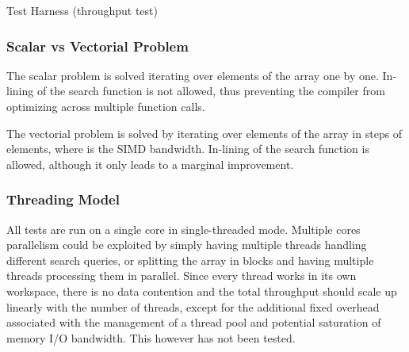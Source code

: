 \documentclass[preprint,1p,times]{elsarticle}
\begin{document}
\begin{algorithm}[ht]
	\caption{Test Harness (throughput test)}
	\label{alg:harness}
	\begin{algorithmic}
  			\For {}  
                \For {} 
					\State {}
					\For {}  
						\State {} 
					\EndFor
					\State {}
					\State {} 
				\EndFor
			\EndFor
			\State {}  
		\EndFunction
	\end{algorithmic}
\end{algorithm}

\subsubsection{Scalar vs Vectorial Problem}
The scalar problem is solved iterating over elements of the array  one by one. In-lining of the search function is not allowed, thus preventing the compiler from optimizing across multiple function calls.

The vectorial problem is solved by iterating over elements of the array  in steps of  elements, where  is the SIMD bandwidth. In-lining of the search function is allowed, although it only leads to a marginal improvement.

\subsubsection{Threading Model}
All tests are run on a single core in single-threaded mode. Multiple cores parallelism could be exploited by simply having multiple threads handling different search queries, or splitting the array  in blocks and having multiple threads processing them in parallel. Since every thread works in its own workspace, there is no data contention and the total throughput should scale up linearly with the number of threads, except for the additional fixed overhead associated with the management of a thread pool and potential saturation of memory I/O bandwidth. This however has not been tested.
\end{document}
